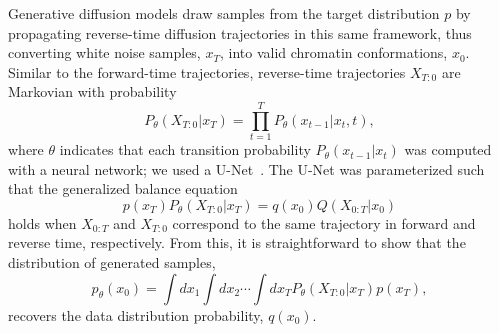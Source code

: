 \documentclass[12pt,letterpaper]{article}
\begin{document}
Generative diffusion models draw samples from the target distribution $p$ by propagating reverse-time diffusion trajectories in this same framework, thus converting white noise samples, $x_T$, into valid chromatin conformations, $x_0$. Similar to the forward-time trajectories, reverse-time trajectories $X_{T:0}$ are Markovian with probability 
$$ P_\theta(X_{T:0}|x_T) = \prod_{t=1}^{T} P_\theta(x_{t-1}\vert x_{t},t),$$
where $\theta$ indicates that each transition probability $P_\theta(x_{t-1}\vert x_{t})$ was computed with a neural network; we used a U-Net~\cite{ronneberger2015UNet}. 
The U-Net was parameterized such that the generalized balance equation
$$ p(x_T) P_\theta(X_{T:0}|x_T) = q(x_0) Q(X_{0:T}|x_0)$$ 
holds when $X_{0:T}$ and $X_{T:0}$ correspond to the same trajectory in forward and reverse time, respectively. 
From this, it is straightforward to show that the distribution of generated samples, $$p_\theta(x_0) = \int dx_1 \int dx_{2} \cdots \int dx_T P_\theta(X_{T:0} | x_T)p(x_T),$$ recovers the data distribution probability, $q(x_0)$.
\end{document}
